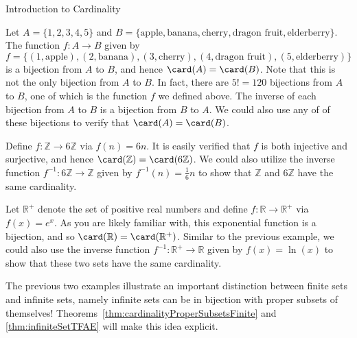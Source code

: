 \begin{section}{Introduction to Cardinality}
\begin{example}
Let $A=\{1,2,3,4,5\}$ and $B=\{\text{apple},\text{banana},\text{cherry},\text{dragon fruit},\text{elderberry}\}$.  The function $f:A\to B$ given by
\[
f=\{(1,\text{apple}),(2,\text{banana}),(3,\text{cherry}),(4,\text{dragon fruit}),(5,\text{elderberry})\}
\]
is a bijection from $A$ to $B$, and hence $\card(A)=\card(B)$.  Note that this is not the only bijection from $A$ to $B$.  In fact, there are $5!=120$ bijections from $A$ to $B$, one of which is the function $f$ we defined above. The inverse of each bijection from $A$ to $B$ is a bijection from $B$ to $A$.  We could also use any of of these bijections to verify that $\card(A)=\card(B)$.
\end{example}

\begin{example}
Define $f:\mathbb{Z}\to 6\mathbb{Z}$ via $f(n)=6n$.  It is easily verified that $f$ is both injective and surjective, and hence $\card(\mathbb{Z})=\card(6\mathbb{Z})$. We could also utilize the inverse function $f^{-1}:6\mathbb{Z}\to \mathbb{Z}$ given by $f^{-1}(n)=\frac{1}{6}n$ to show that $\mathbb{Z}$ and $6\mathbb{Z}$ have the same cardinality.
\end{example}

\begin{example}
Let $\mathbb{R}^+$ denote the set of positive real numbers and define $f:\mathbb{R}\to \mathbb{R}^+$ via $f(x)=e^x$. As you are likely familiar with, this exponential function is a bijection, and so $\card(\mathbb{R})=\card(\mathbb{R}^+)$.  Similar to the previous example, we could also use the inverse function $f^{-1}:\mathbb{R}^+\to \mathbb{R}$ given by $f(x)=\ln(x)$ to show that these two sets have the same cardinality.
\end{example}

The previous two examples illustrate an important distinction between finite sets and infinite sets, namely infinite sets can be in bijection with proper subsets of themselves! Theorems~\ref{thm:cardinalityProperSubsetsFinite} and \ref{thm:infiniteSetTFAE} will make this idea explicit.


\end{section}
